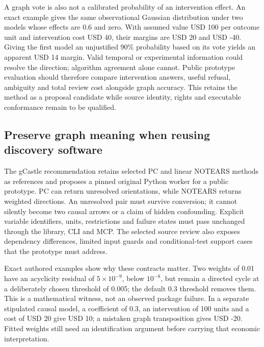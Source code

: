A graph vote is also not a calibrated probability of an intervention
effect. An exact example gives the same observational Gaussian
distribution under two models whose effects are 0.6 and zero. With
assumed value USD 100 per outcome unit and intervention cost USD 40,
their margins are USD 20 and USD -40. Giving the first model an
unjustified 90\% probability based on its vote yields an apparent USD 14
margin. Valid temporal or experimental information could resolve the
direction; algorithm agreement alone cannot. Public prototype evaluation
should therefore compare intervention answers, useful refusal, ambiguity
and total review cost alongside graph accuracy. This retains the method
as a proposal candidate while source identity, rights and executable
conformance remain to be qualified.
\citep{exec20_expert_averaging_reference}

\hypertarget{preserve-graph-meaning-when-reusing-discovery-software}{%
\subsection{Preserve graph meaning when reusing discovery
software}\label{preserve-graph-meaning-when-reusing-discovery-software}}

The gCastle recommendation retains selected PC and linear NOTEARS
methods as references and proposes a pinned original Python worker for a
public prototype. PC can return unresolved orientations, while NOTEARS
returns weighted directions. An unresolved pair must survive conversion;
it cannot silently become two causal arrows or a claim of hidden
confounding. Explicit variable identifiers, units, restrictions and
failure states must pass unchanged through the library, CLI and MCP. The
selected source review also exposes dependency differences, limited
input guards and conditional-test support cases that the prototype must
address. \citep{exec20_gcastle_source}

Exact authored examples show why these contracts matter. Two weights of
0.01 have an acyclicity residual of \(5\times10^{-9}\), below
\(10^{-8}\), but remain a directed cycle at a deliberately chosen
threshold of 0.005; the default 0.3 threshold removes them. This is a
mathematical witness, not an observed package failure. In a separate
stipulated causal model, a coefficient of 0.3, an intervention of 100
units and a cost of USD 20 give USD 10; a mistaken graph transposition
gives USD -20. Fitted weights still need an identification argument
before carrying that economic interpretation.
\citep{exec20_gcastle_reference}


